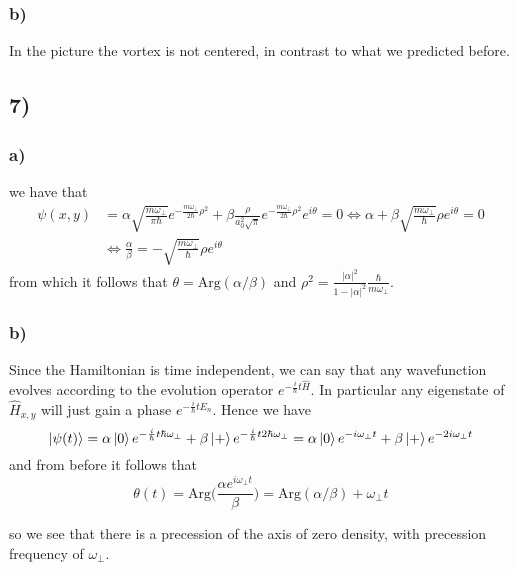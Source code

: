 \documentclass[10pt,a4paper]{book}
\begin{document}
\subsubsection*{b)}
In the picture the vortex is not centered, in contrast to what we predicted before. 

\subsection*{7)}

\subsubsection*{a)}
we have that 
\begin{align*}
\psi(x,y)&=\alpha \sqrt{\frac{m\omega_{\perp}}{\pi \hbar}}e^{-\frac{m\omega_{\perp}}{2\hbar}\rho^2}+\beta\frac{\rho}{a_0^2\sqrt{\pi}}e^{-\frac{m\omega_{\perp}}{2\hbar}\rho^2}e^{i\theta}=0\Leftrightarrow 
\alpha+\beta\sqrt{\frac{m\omega_{\perp}}{\hbar}}\rho e^{i\theta}=0\\
&\Leftrightarrow \frac{\alpha}{\beta}=-\sqrt{\frac{m\omega_{\perp}}{\hbar}}\rho e^{i\theta}
\end{align*}
from which it follows that $\theta=\text{Arg}(\alpha/\beta)$ and $\rho^2=\frac{|\alpha|^2}{1-|\alpha|^2}\frac{\hbar}{m\omega_{\perp}}$.

\subsubsection*{b)}
Since the Hamiltonian is time independent, we can say that any wavefunction evolves according to the evolution operator $e^{-\frac{i}{\hbar}t\hat{H}}$. In particular any eigenstate of $\hat{H}_{x,y}$ will just gain a phase $e^{-\frac{i}{\hbar}tE_n}$. Hence we have
$$\ket{\psi(t)}=\alpha\ket{0}e^{-\frac{i}{\hbar}t\hbar\omega_{\perp}}+\beta\ket{+}e^{-\frac{i}{\hbar}t2\hbar \omega_{\perp}}=\alpha\ket{0}e^{-i\omega_{\perp}t}+\beta\ket{+}e^{-2i\omega_{\perp}t}$$
and from before it follows that 
$$\theta(t)=\text{Arg}\bigg(\frac{\alpha e^{i\omega_{\perp} t}}{\beta}\bigg)=\text{Arg}(\alpha/\beta)+\omega_{\perp}t$$


so we see that there is a precession of the axis of zero density, with precession frequency of $\omega_{\perp}$. 
\end{document}

